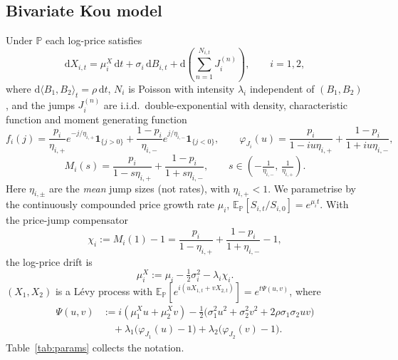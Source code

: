 \documentclass[11pt]{article}
\newcommand{\E}{\mathbb{E}}
\renewcommand{\P}{\mathbb{P}}
\newcommand{\diff}{\mathrm{d}}
\newcommand{\one}{\mathbf{1}}
\theoremstyle{plain}
\theoremstyle{definition}
\theoremstyle{remark}
\begin{document}
\subsection{Bivariate Kou model}
Under $\P$ each log-price satisfies
\begin{equation}\label{eq:log-price-sde}
\diff X_{i,t}
=
\mu_i^X\,\diff t
+
\sigma_i\,\diff B_{i,t}
+
\diff\!\left(\sum_{n=1}^{N_{i,t}} J_i^{(n)}\right),
\qquad i=1,2,
\end{equation}
where $\diff\langle B_1,B_2\rangle_t=\rho\,\diff t$, $N_i$ is Poisson with intensity $\lambda_i$
independent of $(B_1,B_2)$, and the jumps $J_i^{(n)}$ are i.i.d.\ double-exponential with density,
characteristic function and moment generating function
\begin{equation}\label{eq:Kou-char-mgf}
f_i(j)
=
\frac{p_i}{\eta_{i,+}}e^{-j/\eta_{i,+}}\one_{\{j>0\}}
+
\frac{1-p_i}{\eta_{i,-}}e^{j/\eta_{i,-}}\one_{\{j<0\}},
\qquad
\varphi_{J_i}(u)
=
\frac{p_i}{1-iu\eta_{i,+}}
+
\frac{1-p_i}{1+iu\eta_{i,-}},
\end{equation}
\begin{equation}\label{eq:MGF}
M_i(s)
=
\frac{p_i}{1-s\eta_{i,+}}
+
\frac{1-p_i}{1+s\eta_{i,-}},
\qquad
s\in\left(-\tfrac{1}{\eta_{i,-}},\,\tfrac{1}{\eta_{i,+}}\right).
\end{equation}
Here $\eta_{i,\pm}$ are the \emph{mean} jump sizes (not rates), with $\eta_{i,+}<1$. We parametrise
by the continuously compounded price growth rate $\mu_i$, $\E_\P[S_{i,t}/S_{i,0}]=e^{\mu_i t}$. With
the price-jump compensator
\begin{equation}\label{eq:chi}
\chi_i
:=
M_i(1)-1
=
\frac{p_i}{1-\eta_{i,+}}+\frac{1-p_i}{1+\eta_{i,-}}-1,
\end{equation}
the log-price drift is
\begin{equation}\label{eq:muX-drift}
\mu_i^X := \mu_i - \tfrac12\sigma_i^2 - \lambda_i\chi_i.
\end{equation}
$(X_1,X_2)$ is a L\'evy process with $\E_\P[e^{i(uX_{1,t}+vX_{2,t})}]=e^{t\Psi(u,v)}$, where
\begin{equation}\label{eq:Psi}
\begin{aligned}
\Psi(u,v)
&:= i(\mu_1^X u+\mu_2^X v)
-\tfrac12\Big(\sigma_1^2u^2+\sigma_2^2v^2+2\rho\sigma_1\sigma_2uv\Big)\\
&\quad +\lambda_1\big(\varphi_{J_1}(u)-1\big)
+\lambda_2\big(\varphi_{J_2}(v)-1\big).
\end{aligned}
\end{equation}
Table~\ref{tab:params} collects the notation.
\end{document}
